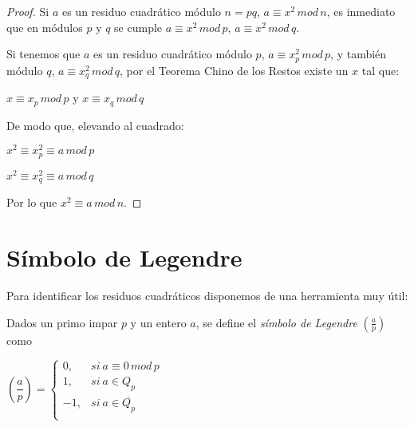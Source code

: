 \begin{proof}	
	Si $a$ es un residuo cuadrático módulo $n=pq$, $a \equiv x^2  \, mod \, n$, es inmediato que en módulos $p$ y $q$ se cumple $a \equiv x^2  \, mod \, p$, $a \equiv x^2  \, mod \, q$.
	
	Si tenemos que $a$ es un residuo cuadrático módulo $p$, $a \equiv x_p^2 \, mod \, p$, y también módulo $q$, $a \equiv x_q^2 \, mod \, q$, por el Teorema Chino de los Restos existe un $x$ tal que:
	
	$x \equiv x_p \, mod \, p$ \quad y \quad $x \equiv x_q \, mod \, q$
	
	De modo que, elevando al cuadrado:
	
	$x^2 \equiv x_p^2 \equiv a \, mod \, p$
	
	$x^2 \equiv x_q^2 \equiv a \, mod \, q$
	
	Por lo que $x^2 \equiv a \, mod \, n$.
	
\end{proof}








\section{Símbolo de Legendre}

Para identificar los residuos cuadráticos disponemos de una herramienta muy útil:

\begin{definition}
	Dados un primo impar $p$ y un entero $a$, se define el \textit{símbolo de Legendre} $\left( \frac{a}{p} \right) $ como
	
	\begin{center}
		$
		\left( \dfrac{a}{p} \right) = 
		\begin{cases}
			0, & si\ a \equiv 0 \, mod \, p\\
			1, & si\ a \in Q_p  \\
			-1, & si\ a \in \overline{Q_p} \\
		\end{cases}
		$
	\end{center}
\end{definition}

